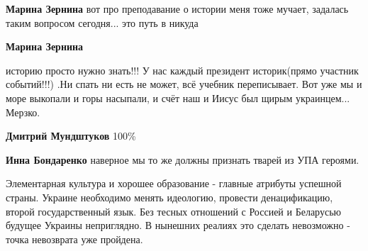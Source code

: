 \begin{itemize}
\begin{itemize}
\textbf{Марина Зернина} вот про преподавание о истории меня тоже мучает, задалась таким вопросом сегодня... это путь в никуда

 
\textbf{Марина Зернина} 

историю просто нужно знать!!! У нас каждый президент историк(прямо участник
событий!!!) .Ни спать ни есть не может, всё учебник переписывает. Вот уже мы и
море выкопали и горы насыпали, и счёт наш и Иисус был щирым украинцем...
Мерзко.


 
\textbf{Дмитрий Мундштуков} 100\%

 
\textbf{Инна Бондаренко} наверное мы то же должны признать тварей из УПА героями.

\end{itemize}

 

Элементарная культура и хорошее образование - главные атрибуты успешной страны.
Украине необходимо менять идеологию, провести денацификацию, второй
государственный язык. Без тесных отношений с Россией и Беларусью будущее
Украины неприглядно. В нынешних реалиях это сделать невозможно - точка
невозврата уже пройдена.


 


\end{itemize}
